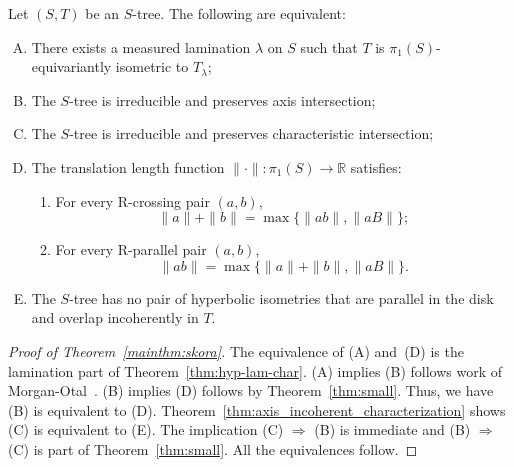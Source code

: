 \documentclass[11pt]{amsart}
\numberwithin{equation}{section}
\numberwithin{figure}{section}
\theoremstyle{definition}
\theoremstyle{plain}
\newenvironment{taggedthm}[1]
 {\renewcommand\thetaggedthmx{#1}\taggedthmx}
 {\endtaggedthmx}
\begin{document}
\begin{taggedthm}{\ref{mainthm:skora}}
Let $(S,T)$ be an $S$-tree. The following are equivalent:
\begin{enumerate}[(A)]
\item There exists a measured lamination $\lambda$ on $S$ such that
$T$ is $\pi_1(S)$-equivariantly isometric to $T_\lambda$;

\item The $S$-tree is irreducible and preserves axis intersection;

\item The $S$-tree is irreducible and preserves characteristic intersection;

\item The translation length function
$\|\cdot\|\colon \pi_1(S)\to\mathbb{R}$ satisfies:
\begin{enumerate}
\item For every R-crossing pair $(a,b)$,
\begin{equation*}
\|a\|+\|b\|
=
\max\{\|ab\|,\|aB\|\};
\end{equation*}

\item For every R-parallel pair $(a,b)$,
\begin{equation*}
\|ab\|
=
\max\{\|a\|+\|b\|,\|aB\|\}.
\end{equation*}
\end{enumerate}

\item The $S$-tree has no pair of hyperbolic isometries that are
parallel in the disk and overlap incoherently in $T$.
\end{enumerate}
\end{taggedthm}

\begin{proof}[Proof of Theorem~\ref{mainthm:skora}]
The equivalence of (A) and~(D) is the lamination part of
Theorem~\ref{thm:hyp-lam-char}.
(A) implies (B) follows work of Morgan-Otal~\cite{MO93:RelativeGrowths}.
(B) implies (D) follows by Theorem~\ref{thm:small}.
Thus, we have (B) is equivalent to (D).
Theorem~\ref{thm:axis_incoherent_characterization} shows (C) is equivalent to (E). The implication (C) $\Rightarrow$ (B) is immediate and (B) $\Rightarrow$ (C) is part
of Theorem~\ref{thm:small}.
All the equivalences follow.
\end{proof}
\end{document}

